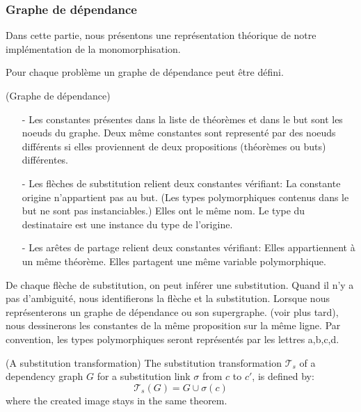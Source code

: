 \subsubsection{Graphe de dépendance}
Dans cette partie, nous présentons une représentation théorique de notre implémentation de la monomorphisation. 
\vspace{2mm}

\noindent Pour chaque problème un graphe de dépendance peut \^etre défini.
\begin{mydef} (Graphe de dépendance)
\begin{enumerate}
  \item [-] Les constantes présentes dans la liste de théorèmes et dans le but sont les noeuds du graphe. Deux m\^eme constantes sont representé par des noeuds différents si elles proviennent de deux propositions (théorèmes ou buts) différentes.
  \item [-] Les flèches de {\color{blue}substitution} relient deux constantes vérifiant: 
    \subitem La constante origine n'appartient pas au but. (Les types polymorphiques contenus dans le but ne sont pas instanciables.)
    \subitem Elles ont le m\^eme nom.
    \subitem Le type du destinataire est une instance du type de l'origine.
  \item [-] Les ar\^etes de {\color{green}partage} relient deux constantes vérifiant:
    \subitem Elles appartiennent à un m\^eme théorème.
    \subitem Elles partagent une m\^eme variable polymorphique.   
\end{enumerate}    
De chaque flèche de substitution, on peut inférer une substitution. Quand il n'y a pas d'ambiguité, nous identifierons la flèche et la substitution.
Lorsque nous représenterons un graphe de dépendance ou son supergraphe.  (voir plus tard), nous dessinerons les constantes de la m\^eme proposition sur la m\^eme ligne. Par convention, les types polymorphiques seront représentés par les lettres a,b,c,d.
\end{mydef}




\iffalse
\noindent \textit{Example of a dependency graph.} 
\begin{center}  

\end{center}
\fi


\begin{mydef} (A substitution transformation)
The substitution transformation $\mathcal{T}_s$ of a dependency graph $G$ for a substitution link $\sigma$ from $c$ to $c'$, is defined by:
\[\mathcal{T}_s(G) = G \cup \sigma(c) \]
where the created image stays in the same theorem.
\end{mydef}

